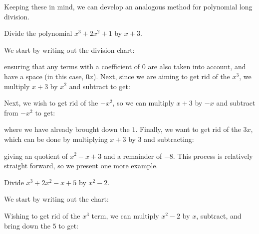 \documentclass[11pt]{scrartcl}
\begin{document}
Keeping these in mind, we can develop an analogous method for polynomial long division.

\begin{example*}
Divide the polynomial $x^3+2x^2+1$ by $x+3$.
\end{example*}

We start by writing out the division chart:

\begin{center}
\end{center}

ensuring that any terms with a coefficient of $0$ are also taken into account, and have a space (in this case, $0x$). Next, since we are aiming to get rid of the $x^3$, we multiply $x+3$ by $x^2$ and subtract to get:

\begin{center}
\end{center}

Next, we wish to get rid of the $-x^2$, so we can multiply $x+3$ by $-x$ and subtract from $-x^2$ to get:

\begin{center}
\end{center}

where we have already brought down the $1$. Finally, we want to get rid of the $3x$, which can be done by multiplying $x+3$ by $3$ and subtracting:

\begin{center}
\end{center}

giving an quotient of $x^2-x+3$ and a remainder of $-8$. This process is relatively straight forward, so we present one more example.

\begin{example*}
Divide $x^3+2x^2-x+5$ by $x^2-2$.
\end{example*}

We start by writing out the chart:

\begin{center}
\end{center}

Wishing to get rid of the $x^3$ term, we can multiply $x^2-2$ by $x$, subtract, and bring down the $5$ to get:

\begin{center}
\end{center}
\end{document}
